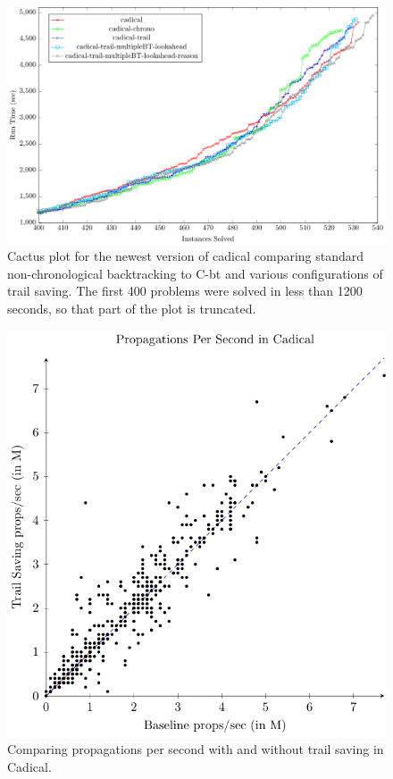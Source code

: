 \documentclass[runningheads]{llncs}
\newcommand{\cbt}{C-bt\xspace}
\begin{document}
\begin{figure}\centering\includegraphics[scale=0.65]{figures/cactus_cadical_new.pdf}\caption{\small{Cactus plot for the newest version of cadical comparing standard non-chronological backtracking to \cbt and various configurations of trail saving. The first 400 problems were solved in less than 1200 seconds, so that part of the plot is truncated.}}\label{fig:cactus_cadical}\end{figure}

\begin{figure}\centering\includegraphics[scale=0.7]{figures/scatter.pdf}\caption{Comparing propagations per second with and without trail saving in Cadical.}\label{fig:props}\end{figure}
\end{document}

